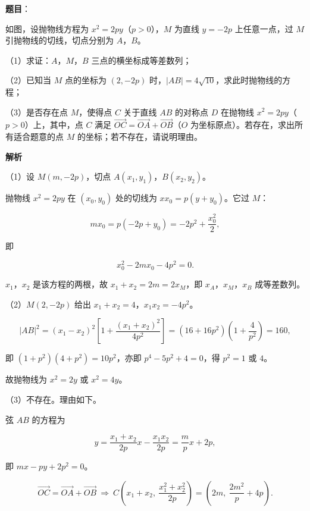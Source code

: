 \begin{answer}

\textbf{题目}：

如图，设抛物线方程为 $x^2=2py$（$p>0$），$M$ 为直线 $y=-2p$ 上任意一点，过 $M$ 引抛物线的切线，切点分别为 $A$，$B$。

（1）求证：$A$，$M$，$B$ 三点的横坐标成等差数列；

（2）已知当 $M$ 点的坐标为 $(2,-2p)$ 时，$|AB|=4\sqrt{10}$，求此时抛物线的方程；

（3）是否存在点 $M$，使得点 $C$ 关于直线 $AB$ 的对称点 $D$ 在抛物线 $x^2=2py$（$p>0$）上，其中，点 $C$ 满足 $\overrightarrow{OC}=\overrightarrow{OA}+\overrightarrow{OB}$（$O$ 为坐标原点）。若存在，求出所有适合题意的点 $M$ 的坐标；若不存在，请说明理由。
\nopagebreak[4]
\begin{center}\end{center}
\nopagebreak[4]
\textbf{解析}

（1）设 $M(m,-2p)$，切点 $A(x_1,y_1)$，$B(x_2,y_2)$。

抛物线 $x^2=2py$ 在 $(x_0,y_0)$ 处的切线为 $xx_0=p(y+y_0)$。它过 $M$：

\nopagebreak[4]
\[mx_0=p\left(-2p+y_0\right)=-2p^2+\frac{x_0^2}2,\]

即

\nopagebreak[4]
\[x_0^2-2mx_0-4p^2=0.\]

$x_1$，$x_2$ 是该方程的两根，故 $x_1+x_2=2m=2x_M$，即 $x_A$，$x_M$，$x_B$ 成等差数列。

（2）$M(2,-2p)$ 给出 $x_1+x_2=4$，$x_1x_2=-4p^2$。

\nopagebreak[4]
\[|AB|^2=(x_1-x_2)^2\left[1+\frac{(x_1+x_2)^2}{4p^2}\right]=\left(16+16p^2\right)\left(1+\frac4{p^2}\right)=160,\]

即 $\left(1+p^2\right)\left(4+p^2\right)=10p^2$，亦即 $p^4-5p^2+4=0$，得 $p^2=1$ 或 $4$。

故抛物线为 $x^2=2y$ 或 $x^2=4y$。

（3）不存在。理由如下。

弦 $AB$ 的方程为

\nopagebreak[4]
\[y=\frac{x_1+x_2}{2p}x-\frac{x_1x_2}{2p}=\frac mp x+2p,\]

即 $mx-py+2p^2=0$。

\nopagebreak[4]
\[\overrightarrow{OC}=\overrightarrow{OA}+\overrightarrow{OB}\ \Longrightarrow\ C\left(x_1+x_2,\ \frac{x_1^2+x_2^2}{2p}\right)=\left(2m,\ \frac{2m^2}p+4p\right).\]


\end{answer}
